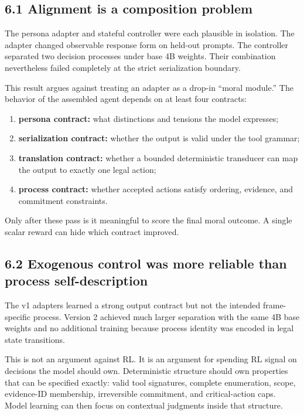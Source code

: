 \documentclass[
  11pt,
  letterpaper,
]{article}
\providecommand{\tightlist}{%
  \setlength{\itemsep}{0pt}\setlength{\parskip}{0pt}}
\begin{document}
\subsection{6.1 Alignment is a composition
problem}\label{alignment-is-a-composition-problem}

The persona adapter and stateful controller were each plausible in
isolation. The adapter changed observable response form on held-out
prompts. The controller separated two decision processes under base 4B
weights. Their combination nevertheless failed completely at the strict
serialization boundary.

This result argues against treating an adapter as a drop-in ``moral
module.'' The behavior of the assembled agent depends on at least four
contracts:

\begin{enumerate}
\def\labelenumi{\arabic{enumi}.}
\tightlist
\item
  \textbf{persona contract:} what distinctions and tensions the model
  expresses;
\item
  \textbf{serialization contract:} whether the output is valid under the
  tool grammar;
\item
  \textbf{translation contract:} whether a bounded deterministic
  transducer can map the output to exactly one legal action;
\item
  \textbf{process contract:} whether accepted actions satisfy ordering,
  evidence, and commitment constraints.
\end{enumerate}

Only after these pass is it meaningful to score the final moral outcome.
A single scalar reward can hide which contract improved.

\subsection{6.2 Exogenous control was more reliable than process
self-description}\label{exogenous-control-was-more-reliable-than-process-self-description}

The v1 adapters learned a strong output contract but not the intended
frame-specific process. Version 2 achieved much larger separation with
the same 4B base weights and no additional training because process
identity was encoded in legal state transitions.

This is not an argument against RL. It is an argument for spending RL
signal on decisions the model should own. Deterministic structure should
own properties that can be specified exactly: valid tool signatures,
complete enumeration, scope, evidence-ID membership, irreversible
commitment, and critical-action caps. Model learning can then focus on
contextual judgments inside that structure.
\end{document}

